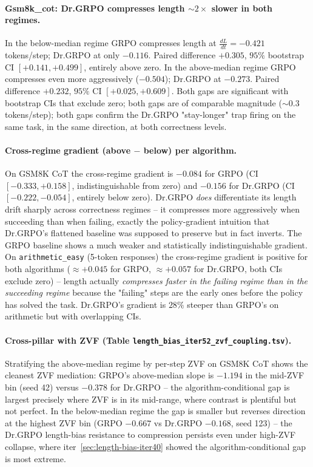\paragraph{Gsm8k\_cot: Dr.GRPO compresses length $\sim 2\times$ slower in both regimes.}
In the below-median regime GRPO compresses length at
$\tfrac{dL}{dt} = -0.421$ tokens/step; Dr.GRPO at only $-0.116$. Paired
difference $+0.305$, $95\%$ bootstrap CI $[+0.141, +0.499]$, entirely
above zero. In the above-median regime GRPO compresses even more
aggressively ($-0.504$); Dr.GRPO at $-0.273$. Paired difference $+0.232$,
$95\%$ CI $[+0.025, +0.609]$. Both gaps are significant with
bootstrap CIs that exclude zero; both gaps are of comparable magnitude
($\sim 0.3$ tokens/step); both gaps confirm the Dr.GRPO "stay-longer"
trap firing on the same task, in the same direction, at both
correctness levels.

\paragraph{Cross-regime gradient (above $-$ below) per algorithm.}
On GSM8K CoT the cross-regime gradient is $-0.084$ for GRPO (CI
$[-0.333, +0.158]$, indistinguishable from zero) and $-0.156$ for
Dr.GRPO (CI $[-0.222, -0.054]$, entirely below zero). Dr.GRPO
\emph{does} differentiate its length drift sharply across correctness
regimes -- it compresses more aggressively when succeeding than when
failing, exactly the policy-gradient intuition that Dr.GRPO's flattened
baseline was supposed to preserve but in fact inverts. The GRPO baseline
shows a much weaker and statistically indistinguishable gradient.
On \texttt{arithmetic\_easy} (5-token responses) the cross-regime
gradient is positive for both algorithms ($\approx +0.045$ for GRPO,
$\approx +0.057$ for Dr.GRPO, both CIs exclude zero) -- length actually
\emph{compresses faster in the failing regime than in the succeeding
regime} because the "failing" steps are the early ones before the
policy has solved the task. Dr.GRPO's gradient is $28\%$ steeper than
GRPO's on arithmetic but with overlapping CIs.

\paragraph{Cross-pillar with ZVF (Table \texttt{length\_bias\_iter52\_zvf\_coupling.tsv}).}
Stratifying the above-median regime by per-step ZVF on GSM8K CoT shows
the cleanest ZVF mediation: GRPO's above-median slope is $-1.194$ in
the mid-ZVF bin (seed 42) versus $-0.378$ for Dr.GRPO -- the
algorithm-conditional gap is largest precisely where ZVF is in its
mid-range, where contrast is plentiful but not perfect. In the
below-median regime the gap is smaller but reverses direction at the
highest ZVF bin (GRPO $-0.667$ vs Dr.GRPO $-0.168$, seed 123) -- the
Dr.GRPO length-bias resistance to compression persists even under
high-ZVF collapse, where iter~\ref{sec:length-bias-iter40} showed the
algorithm-conditional gap is most extreme.

